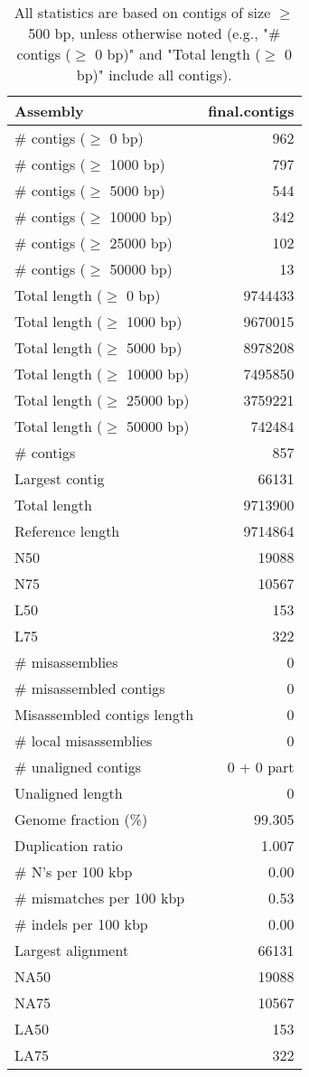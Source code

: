 \documentclass[12pt,a4paper]{article}
\begin{document}
\begin{table}[ht]
\begin{center}
\caption{All statistics are based on contigs of size $\geq$ 500 bp, unless otherwise noted (e.g., "\# contigs ($\geq$ 0 bp)" and "Total length ($\geq$ 0 bp)" include all contigs).}
\begin{tabular}{|l*{1}{|r}|}
\hline
Assembly & final.contigs \\ \hline
\# contigs ($\geq$ 0 bp) & 962 \\ \hline
\# contigs ($\geq$ 1000 bp) & 797 \\ \hline
\# contigs ($\geq$ 5000 bp) & 544 \\ \hline
\# contigs ($\geq$ 10000 bp) & 342 \\ \hline
\# contigs ($\geq$ 25000 bp) & 102 \\ \hline
\# contigs ($\geq$ 50000 bp) & 13 \\ \hline
Total length ($\geq$ 0 bp) & 9744433 \\ \hline
Total length ($\geq$ 1000 bp) & 9670015 \\ \hline
Total length ($\geq$ 5000 bp) & 8978208 \\ \hline
Total length ($\geq$ 10000 bp) & 7495850 \\ \hline
Total length ($\geq$ 25000 bp) & 3759221 \\ \hline
Total length ($\geq$ 50000 bp) & 742484 \\ \hline
\# contigs & 857 \\ \hline
Largest contig & 66131 \\ \hline
Total length & 9713900 \\ \hline
Reference length & 9714864 \\ \hline
N50 & 19088 \\ \hline
N75 & 10567 \\ \hline
L50 & 153 \\ \hline
L75 & 322 \\ \hline
\# misassemblies & 0 \\ \hline
\# misassembled contigs & 0 \\ \hline
Misassembled contigs length & 0 \\ \hline
\# local misassemblies & 0 \\ \hline
\# unaligned contigs & 0 + 0 part \\ \hline
Unaligned length & 0 \\ \hline
Genome fraction (\%) & 99.305 \\ \hline
Duplication ratio & 1.007 \\ \hline
\# N's per 100 kbp & 0.00 \\ \hline
\# mismatches per 100 kbp & 0.53 \\ \hline
\# indels per 100 kbp & 0.00 \\ \hline
Largest alignment & 66131 \\ \hline
NA50 & 19088 \\ \hline
NA75 & 10567 \\ \hline
LA50 & 153 \\ \hline
LA75 & 322 \\ \hline
\end{tabular}
\end{center}
\end{table}
\end{document}
